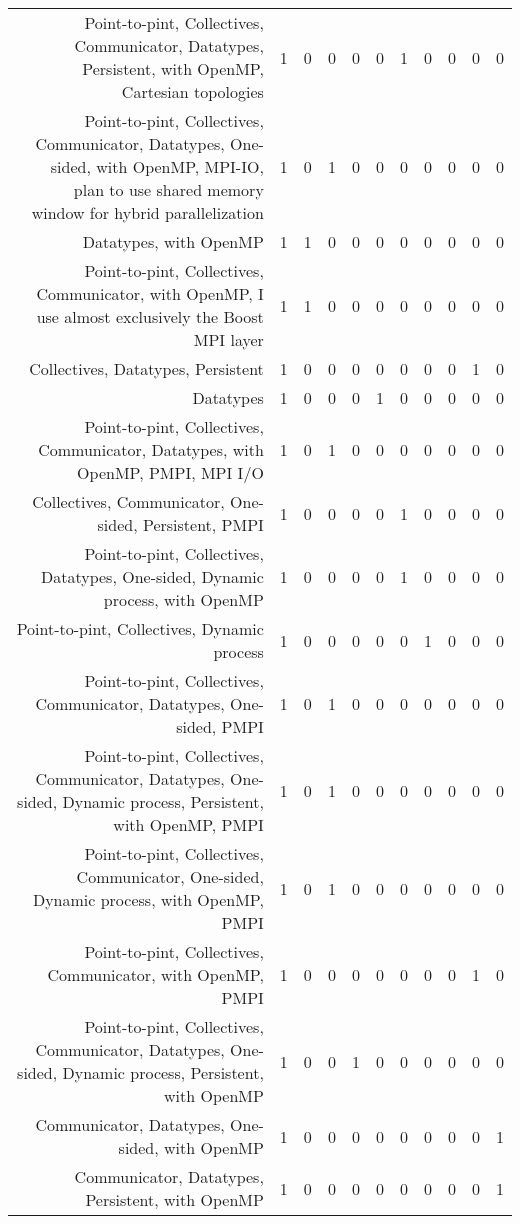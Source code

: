 {\begin{landscape}
\begin{longtable}[htb]{r|c|c|c|c|c|c|c|c|c|c}
{Point-to-pint, Collectives, Communicator, Datatypes, Persistent, with OpenMP, Cartesian topologies} & 1 & 0 & 0 & 0 & 0 & 1 & 0 & 0 & 0 & 0 \\%
{Point-to-pint, Collectives, Communicator, Datatypes, One-sided, with OpenMP, MPI-IO, plan to use shared memory window for hybrid parallelization} & 1 & 0 & 1 & 0 & 0 & 0 & 0 & 0 & 0 & 0 \\%
{Datatypes, with OpenMP} & 1 & 1 & 0 & 0 & 0 & 0 & 0 & 0 & 0 & 0 \\%
{Point-to-pint, Collectives, Communicator, with OpenMP, I use almost exclusively the Boost MPI layer} & 1 & 1 & 0 & 0 & 0 & 0 & 0 & 0 & 0 & 0 \\%
{Collectives, Datatypes, Persistent} & 1 & 0 & 0 & 0 & 0 & 0 & 0 & 0 & 1 & 0 \\%
{Datatypes} & 1 & 0 & 0 & 0 & 1 & 0 & 0 & 0 & 0 & 0 \\%
{Point-to-pint, Collectives, Communicator, Datatypes, with OpenMP, PMPI, MPI I/O} & 1 & 0 & 1 & 0 & 0 & 0 & 0 & 0 & 0 & 0 \\%
{Collectives, Communicator, One-sided, Persistent, PMPI} & 1 & 0 & 0 & 0 & 0 & 1 & 0 & 0 & 0 & 0 \\%
{Point-to-pint, Collectives, Datatypes, One-sided, Dynamic process, with OpenMP} & 1 & 0 & 0 & 0 & 0 & 1 & 0 & 0 & 0 & 0 \\%
{Point-to-pint, Collectives, Dynamic process} & 1 & 0 & 0 & 0 & 0 & 0 & 1 & 0 & 0 & 0 \\%
{Point-to-pint, Collectives, Communicator, Datatypes, One-sided, PMPI} & 1 & 0 & 1 & 0 & 0 & 0 & 0 & 0 & 0 & 0 \\%
{Point-to-pint, Collectives, Communicator, Datatypes, One-sided, Dynamic process, Persistent, with OpenMP, PMPI} & 1 & 0 & 1 & 0 & 0 & 0 & 0 & 0 & 0 & 0 \\%
{Point-to-pint, Collectives, Communicator, One-sided, Dynamic process, with OpenMP, PMPI} & 1 & 0 & 1 & 0 & 0 & 0 & 0 & 0 & 0 & 0 \\%
{Point-to-pint, Collectives, Communicator, with OpenMP, PMPI} & 1 & 0 & 0 & 0 & 0 & 0 & 0 & 0 & 1 & 0 \\%
{Point-to-pint, Collectives, Communicator, Datatypes, One-sided, Dynamic process, Persistent, with OpenMP} & 1 & 0 & 0 & 1 & 0 & 0 & 0 & 0 & 0 & 0 \\%
{Communicator, Datatypes, One-sided, with OpenMP} & 1 & 0 & 0 & 0 & 0 & 0 & 0 & 0 & 0 & 1 \\%
{Communicator, Datatypes, Persistent, with OpenMP} & 1 & 0 & 0 & 0 & 0 & 0 & 0 & 0 & 0 & 1 \\%

\end{longtable}
\end{landscape}}
